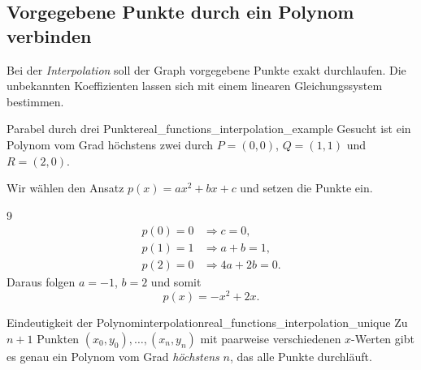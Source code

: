 \subsection{Vorgegebene Punkte durch ein Polynom verbinden}
\label{subsec:real_functions_interpolation}
Bei der \emph{Interpolation}  soll der Graph
vorgegebene Punkte exakt durchlaufen. Die unbekannten Koeffizienten
lassen sich mit einem linearen Gleichungssystem bestimmen.
\begin{ExampleBox}{Parabel durch drei Punkte}{real_functions_interpolation_example}
  Gesucht ist ein Polynom vom Grad höchstens zwei durch
  $P=(0,0)$, $Q=(1,1)$ und $R=(2,0)$.
  \par\smallskip
  \begin{minipage}[t]{0.52\linewidth}
    \vspace{0pt}
    Wir wählen den Ansatz $p(x)=ax^2+bx+c$ und setzen die Punkte ein.
    \begin{ClozeArea}[17]{9}
      \[
        \begin{aligned}
          p(0)=0&\Rightarrow c=0,\\
          p(1)=1&\Rightarrow a+b=1,\\
          p(2)=0&\Rightarrow4a+2b=0.
        \end{aligned}
      \]
      Daraus folgen $a=-1$, $b=2$ und somit
      \[
        p(x)=-x^2+2x.
      \]
    \end{ClozeArea}
  \end{minipage}\hfill
  \begin{minipage}[t]{0.44\linewidth}
    \vspace{0pt}\centering
  \end{minipage}
\end{ExampleBox}
\begin{TheoremBox}{Eindeutigkeit der Polynominterpolation}{real_functions_interpolation_unique}
  Zu $n+1$ Punkten $(x_0,y_0),\dots,(x_n,y_n)$ mit paarweise verschiedenen
  $x$-Werten gibt es genau ein Polynom vom Grad \emph{höchstens} $n$,
  das alle Punkte durchläuft.
\end{TheoremBox}
